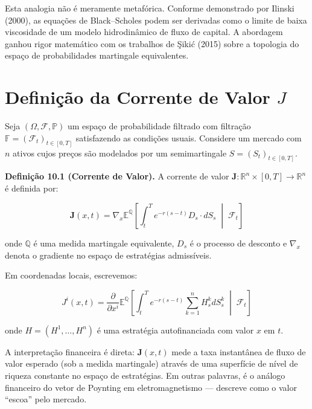 Esta analogia n\~ao \'e meramente metaf\'orica. Conforme demonstrado por Ilinski (2000), as equa\c{c}\~oes de Black--Scholes podem ser derivadas como o limite de baixa viscosidade de um modelo hidrodin\^amico de fluxo de capital. A abordagem ganhou rigor matem\'atico com os trabalhos de \c{S}iki\'c (2015) sobre a topologia do espa\c{c}o de probabilidades martingale equivalentes.

\section{Defini\c{c}\~ao da Corrente de Valor $J$}

Seja $(\Omega, \mathcal{F}, \mathbb{P})$ um espa\c{c}o de probabilidade filtrado com filtra\c{c}\~ao $\mathbb{F}=(\mathcal{F}_t)_{t\in[0,T]}$ satisfazendo as condi\c{c}\~oes usuais. Considere um mercado com $n$ ativos cujos pre\c{c}os s\~ao modelados por um semimartingale $S=(S_t)_{t\in[0,T]}$.

\smallskip
\noindent\textbf{Defini\c{c}\~ao 10.1 (Corrente de Valor).} A corrente de valor $\mathbf{J}: \mathbb{R}^n \times [0,T] \to \mathbb{R}^n$ \'e definida por:

\begin{equation}\label{eq:corrente-valor}
\mathbf{J}(x,t) = \nabla_x \mathbb{E}^{\mathbb{Q}}\left[ \int_t^T e^{-r(s-t)} D_s \cdot dS_s \;\middle|\; \mathcal{F}_t \right]
\end{equation}

onde $\mathbb{Q}$ \'e uma medida martingale equivalente, $D_s$ \'e o processo de desconto e $\nabla_x$ denota o gradiente no espa\c{c}o de estrat\'egias admiss\'iveis.

Em coordenadas locais, escrevemos:

\begin{equation}\label{eq:corrente-componentes}
J^i(x,t) = \frac{\partial}{\partial x^i} \mathbb{E}^{\mathbb{Q}}\left[ \int_t^T e^{-r(s-t)} \sum_{k=1}^n H^k_s dS^k_s \;\middle|\; \mathcal{F}_t \right]
\end{equation}

onde $H=(H^1,\dots,H^n)$ \'e uma estrat\'egia autofinanciada com valor $x$ em $t$.

A interpreta\c{c}\~ao financeira \'e direta: $\mathbf{J}(x,t)$ mede a taxa instant\^anea de fluxo de valor esperado (sob a medida martingale) atrav\'es de uma superf\'icie de n\'ivel de riqueza constante no espa\c{c}o de estrat\'egias. Em outras palavras, \'e o an\'alogo financeiro do vetor de Poynting em eletromagnetismo --- descreve como o valor ``escoa'' pelo mercado.

